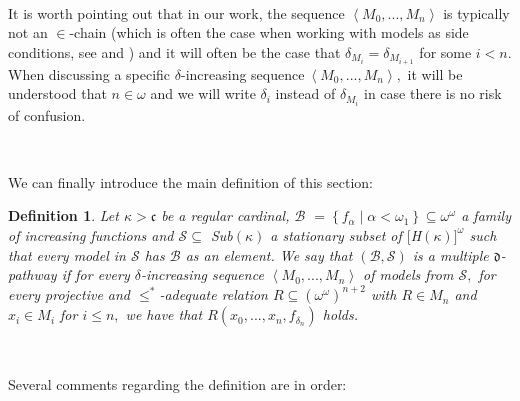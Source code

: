 \documentclass{article}%
\newtheorem{definition}[theorem]{Definition}
\begin{document}
\qquad\qquad\ \ \ 

It is worth pointing out that in our work, the sequence $\left\langle
M_{0},...,M_{n}\right\rangle $ is typically not an $\in$-chain (which is often
the case when working with models as side conditions, see
\cite{PartitionProblems} and \cite{NotesonForcingAxioms}) and it will often be
the case that $\delta_{M_{i}}=\delta_{M_{i+1}}$ for some $i<n.$ When
discussing a specific $\delta$-increasing sequence$\ \left\langle
M_{0},...,M_{n}\right\rangle ,$ it will be understood that $n\in\omega$ and we
will write $\delta_{i}$ instead of $\delta_{M_{i}}$ in case there is no risk
of confusion.

\qquad\ \ \ 

We can finally introduce the main definition of this section:

\begin{definition}
Let $\kappa>\mathfrak{c}$ be a regular cardinal, $\mathcal{B}$ $=\left\{
f_{\alpha}\mid\alpha<\omega_{1}\right\}  \subseteq\omega^{\omega}$ a family of
increasing functions and $\mathcal{S\subseteq}$ \textsf{Sub}$\left(
\kappa\right)  $ a stationary subset of $[$\emph{H}$\left(  \kappa\right)
]^{\omega}$ such that every model in $\mathcal{S}$ has $\mathcal{B}$ as an
element. We say that $\left(  \mathcal{B},\mathcal{S}\right)  $ is a
\emph{multiple} $\mathfrak{d}$\emph{-pathway }if for every $\delta$-increasing
sequence $\left\langle M_{0},...,M_{n}\right\rangle $ of models from
$\mathcal{S},$ for every projective and $\leq^{\ast}$-adequate relation
$R\subseteq\left(  \omega^{\omega}\right)  ^{n+2}$ with $R\in M_{n}$ and
$x_{i}\in M_{i}$ for $i\leq n,$ we have that $R\left(  x_{0},...,x_{n}%
,f_{\delta_{n}}\right)  $ holds.
\end{definition}

\qquad\ \ \ 

Several comments regarding the definition are in order:
\end{document}
